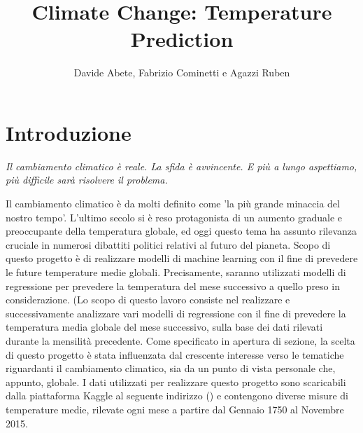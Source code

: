 \documentclass[12pt, a4paper, twocolumn]{article} %
\title{Climate Change: Temperature Prediction} %
\author{
	Davide Abete, Fabrizio Cominetti e Agazzi Ruben %
}
\begin{document}

\maketitle %

\thispagestyle{firstpage} %

\tableofcontents
\bigskip
\bigskip
\bigskip
\bigskip
\bigskip
{}


\section{Introduzione}
\textit{Il cambiamento climatico è reale. La sfida è avvincente. E più a lungo aspettiamo, più difficile sarà risolvere il problema.} \cite{climatequote}
\bigskip

Il cambiamento climatico è da molti definito come 'la più grande minaccia del nostro tempo'. L'ultimo secolo si è reso protagonista di un aumento graduale e preoccupante della temperatura globale, ed oggi questo tema ha assunto rilevanza cruciale in numerosi dibattiti politici relativi al futuro del pianeta. \cite{climatepaper} %
Scopo di questo progetto è di realizzare modelli di machine learning con il fine di prevedere le future temperature medie globali. Precisamente, saranno utilizzati modelli di regressione per prevedere la temperatura del mese successivo a quello preso in considerazione.
(Lo scopo di questo lavoro consiste nel realizzare e successivamente analizzare vari modelli di regressione con il fine di prevedere la temperatura media globale del mese successivo, sulla base dei dati rilevati durante la mensilità precedente.
Come specificato in apertura di sezione, la scelta di questo progetto è stata influenzata dal crescente interesse verso le tematiche riguardanti il cambiamento climatico, sia da un punto di vista personale che, appunto, globale.
I dati utilizzati per realizzare questo progetto sono scaricabili dalla piattaforma Kaggle al seguente indirizzo () e contengono diverse misure di temperature medie, rilevate ogni mese a partire dal Gennaio 1750 al Novembre 2015.
\end{document}
